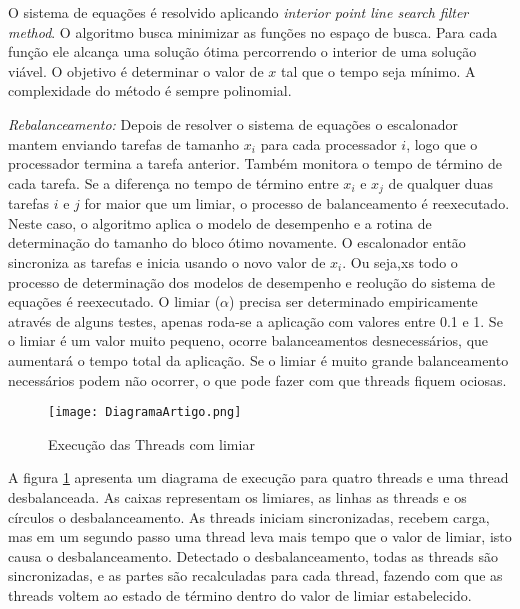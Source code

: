 O sistema de equações é resolvido aplicando  \emph{interior point line search filter method}. O algoritmo busca minimizar as funções no espaço de busca. Para cada função  ele alcança uma solução ótima percorrendo o interior de uma solução viável. O objetivo é determinar o valor de $x$ tal que o tempo seja mínimo. A complexidade do método é sempre polinomial.

\textit{Rebalanceamento:} Depois de resolver o sistema de equações o escalonador mantem enviando tarefas de tamanho $x_i$ para cada processador $i$, logo que o processador termina a tarefa anterior. Também monitora o tempo de término de cada tarefa. Se a diferença no tempo de término entre $x_i$ e $x_j$ de qualquer duas tarefas $i$ e $j$ for maior que um limiar, o processo de balanceamento é reexecutado. Neste caso, o algoritmo aplica o modelo de desempenho e a rotina de determinação do tamanho do bloco ótimo novamente. O escalonador então sincroniza as tarefas e inicia usando o novo valor de $x_i$. Ou seja,xs todo o processo de determinação dos modelos de desempenho e reolução do sistema de equações é reexecutado. O limiar ($\alpha$) precisa ser determinado empiricamente através de alguns testes, apenas roda-se a aplicação com valores entre 0.1 e 1. Se o limiar é um valor muito pequeno, ocorre balanceamentos desnecessários, que aumentará o tempo total da aplicação. Se o limiar é muito grande balanceamento necessários podem não ocorrer, o que pode fazer com que threads fiquem ociosas.

\begin{figure}[!t]
	\centering
			\texttt{[image: DiagramaArtigo.png]}
	\caption{Execução das Threads com limiar}
	\label{fig:Diagrama}
\end{figure}

A figura \ref{fig:Diagrama} apresenta um diagrama de execução para quatro threads e uma thread desbalanceada. As caixas representam os limiares, as linhas as threads e os círculos o desbalanceamento. As threads iniciam sincronizadas, recebem carga, mas em um segundo passo uma thread leva mais tempo que o valor de limiar, isto causa o desbalanceamento. Detectado o desbalanceamento, todas as threads são sincronizadas, e as partes são recalculadas para cada thread, fazendo com que as threads voltem ao estado de término dentro do valor de limiar estabelecido.



